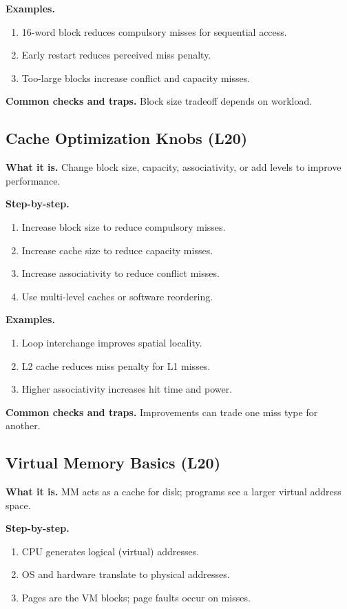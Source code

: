 \documentclass[11pt]{article}
\begin{document}
\textbf{Examples.}
\begin{enumerate}[leftmargin=*]
  \item 16-word block reduces compulsory misses for sequential access.
  \item Early restart reduces perceived miss penalty.
  \item Too-large blocks increase conflict and capacity misses.
\end{enumerate}

\textbf{Common checks and traps.} Block size tradeoff depends on workload.

\subsection{Cache Optimization Knobs (L20)}
\textbf{What it is.} Change block size, capacity, associativity, or add levels to improve performance.

\textbf{Step-by-step.}
\begin{enumerate}[leftmargin=*]
  \item Increase block size to reduce compulsory misses.
  \item Increase cache size to reduce capacity misses.
  \item Increase associativity to reduce conflict misses.
  \item Use multi-level caches or software reordering.
\end{enumerate}

\textbf{Examples.}
\begin{enumerate}[leftmargin=*]
  \item Loop interchange improves spatial locality.
  \item L2 cache reduces miss penalty for L1 misses.
  \item Higher associativity increases hit time and power.
\end{enumerate}

\textbf{Common checks and traps.} Improvements can trade one miss type for another.

\subsection{Virtual Memory Basics (L20)}
\textbf{What it is.} MM acts as a cache for disk; programs see a larger virtual address space.

\textbf{Step-by-step.}
\begin{enumerate}[leftmargin=*]
  \item CPU generates logical (virtual) addresses.
  \item OS and hardware translate to physical addresses.
  \item Pages are the VM blocks; page faults occur on misses.
\end{enumerate}
\end{document}
